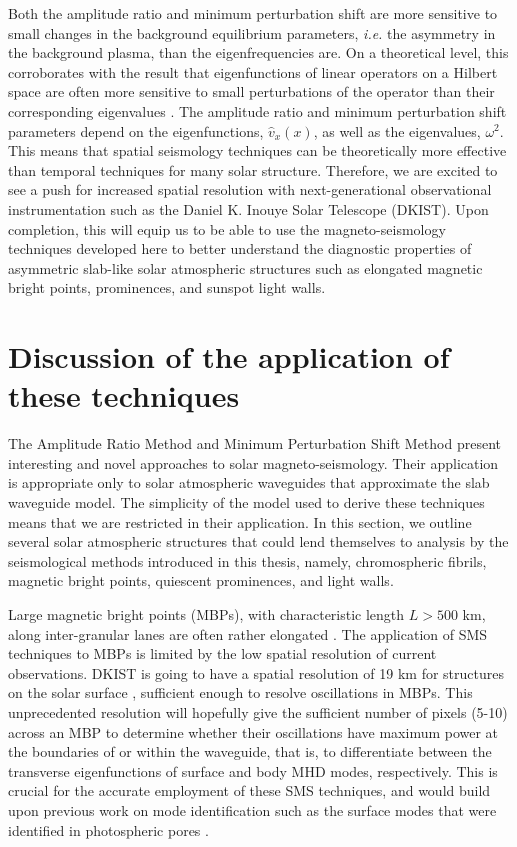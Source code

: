 \documentclass[12pt]{../style-files/ociamthesis}
\begin{document}
Both the amplitude ratio and minimum perturbation shift are more sensitive to small changes in the background equilibrium parameters, \emph{i.e.} the asymmetry in the background plasma, than the eigenfrequencies are. On a theoretical level, this corroborates with the result that eigenfunctions of linear operators on a Hilbert space are often more sensitive to small perturbations of the operator than their corresponding eigenvalues \citep{kat95}. The amplitude ratio and minimum perturbation shift parameters depend on the eigenfunctions, $\widehat{v}_x(x)$, as well as the eigenvalues, $\omega^2$. This means that spatial seismology techniques can be theoretically more effective than temporal techniques for many solar structure. Therefore, we are excited to see a push for increased spatial resolution with next-generational observational instrumentation such as the Daniel K. Inouye Solar Telescope (DKIST). Upon completion, this will equip us to be able to use the magneto-seismology techniques developed here to better understand the diagnostic properties of asymmetric slab-like solar atmospheric structures such as elongated magnetic bright points, prominences, and sunspot light walls.


\section{Discussion of the application of these techniques}
\label{sec: SMS discussion}

The Amplitude Ratio Method and Minimum Perturbation Shift Method present interesting and novel approaches to solar magneto-seismology. Their application is appropriate only to solar atmospheric waveguides that approximate the slab waveguide model. The simplicity of the model used to derive these techniques means that we are restricted in their application. In this section, we outline several solar atmospheric structures that could lend themselves to analysis by the seismological methods introduced in this thesis, namely, chromospheric fibrils, magnetic bright points, quiescent prominences, and light walls.



Large magnetic bright points (MBPs), with characteristic length $L > 500$ km, along inter-granular lanes are often rather elongated \citep{cro_etal10}. The application of SMS techniques to MBPs is limited by the low spatial resolution of current observations. DKIST is going to have a spatial resolution of 19 km for structures on the solar surface \citep{tri_etal15}, sufficient enough to resolve oscillations in MBPs. This unprecedented resolution will hopefully give the sufficient number of pixels (5-10) across an MBP to determine whether their oscillations have maximum power at the boundaries of or within the waveguide, that is, to differentiate between the transverse eigenfunctions of surface and body MHD modes, respectively. This is crucial for the accurate employment of these SMS techniques, and would build upon previous work on mode identification such as the surface modes that were identified in photospheric pores \citep{mor_etal15}.
\end{document}
